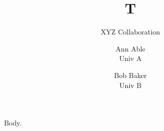 \documentclass{article}
\begin{document}
\title{T}
\author{XYZ Collaboration \and Ann Able\\ Univ A \and Bob Baker\\ Univ B}
\maketitle
Body.
\end{document}
